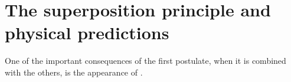 \section{The superposition principle and physical predictions}
One of the important consequences of the first postulate, when it is combined with the others, is the appearance of .